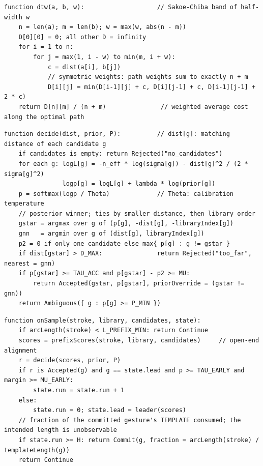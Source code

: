 \begin{lstlisting}[language=Pseudo,caption={Band-constrained dynamic time warping.},label={lst:dtw}]
function dtw(a, b, w):                    // Sakoe-Chiba band of half-width w
    n = len(a); m = len(b); w = max(w, abs(n - m))
    D[0][0] = 0; all other D = infinity
    for i = 1 to n:
        for j = max(1, i - w) to min(m, i + w):
            c = dist(a[i], b[j])
            // symmetric weights: path weights sum to exactly n + m
            D[i][j] = min(D[i-1][j] + c, D[i][j-1] + c, D[i-1][j-1] + 2 * c)
    return D[n][m] / (n + m)               // weighted average cost along the optimal path
\end{lstlisting}

\begin{lstlisting}[language=Pseudo,caption={Posterior and decision rule (Definition~\ref{def:decision}).},label={lst:decide}]
function decide(dist, prior, P):          // dist[g]: matching distance of each candidate g
    if candidates is empty: return Rejected("no_candidates")
    for each g: logL[g] = -n_eff * log(sigma[g]) - dist[g]^2 / (2 * sigma[g]^2)
                logp[g] = logL[g] + lambda * log(prior[g])
    p = softmax(logp / Theta)             // Theta: calibration temperature
    // posterior winner; ties by smaller distance, then library order
    gstar = argmax over g of (p[g], -dist[g], -libraryIndex[g])
    gnn   = argmin over g of (dist[g], libraryIndex[g])
    p2 = 0 if only one candidate else max{ p[g] : g != gstar }
    if dist[gstar] > D_MAX:               return Rejected("too_far", nearest = gnn)
    if p[gstar] >= TAU_ACC and p[gstar] - p2 >= MU:
        return Accepted(gstar, p[gstar], priorOverride = (gstar != gnn))
    return Ambiguous({ g : p[g] >= P_MIN })
\end{lstlisting}

\begin{lstlisting}[language=Pseudo,caption={Early commit on a stroke prefix.},label={lst:commit}]
function onSample(stroke, library, candidates, state):
    if arcLength(stroke) < L_PREFIX_MIN: return Continue
    scores = prefixScores(stroke, library, candidates)     // open-end alignment
    r = decide(scores, prior, P)
    if r is Accepted(g) and g == state.lead and p >= TAU_EARLY and margin >= MU_EARLY:
        state.run = state.run + 1
    else:
        state.run = 0; state.lead = leader(scores)
    // fraction of the committed gesture's TEMPLATE consumed; the intended length is unobservable
    if state.run >= H: return Commit(g, fraction = arcLength(stroke) / templateLength(g))
    return Continue
\end{lstlisting}


